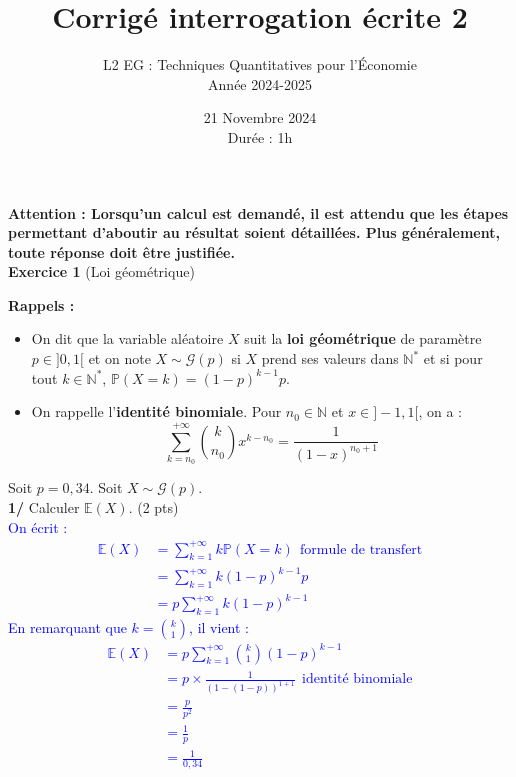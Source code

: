 \documentclass[a4paper,12pt]{article}
\title{Corrigé interrogation écrite 2}
\author{L2 EG : Techniques Quantitatives pour l'Économie \\ Année 2024-2025}
\date{21 Novembre 2024 \\
Durée : 1h}
\newcommand{\E}{\mathbb{E}}
\newcommand{\prob}{\mathbb{P}}
\begin{document}
\maketitle

\textbf{Attention : Lorsqu'un calcul est demandé, il est attendu que les étapes permettant d'aboutir au résultat soient détaillées. Plus généralement, toute réponse doit être justifiée.} \\

\textbf{Exercice 1} (Loi géométrique) \\

\begin{tcolorbox}[colframe=black, colback=white, sharp corners, width=\textwidth, boxrule=0.5mm]
\textbf{Rappels :}\\
\begin{itemize}
    \item On dit que la variable aléatoire $X$ suit la \textbf{loi géométrique} de paramètre $p \in ]0,1[$ et on note $X \sim \mathcal{G} (p)$ si $X$ prend ses valeurs dans $\mathbb{N}^*$ et si pour tout $k \in \mathbb{N}^*$, $\prob (X=k) = (1-p)^{k-1} p$. \\

\item On rappelle l'\textbf{identité binomiale}. Pour $n_0 \in \mathbb{N}$ et $x \in ]-1,1[$, on a :
$$\sum_{k=n_0}^{+\infty} \binom{k}{n_0} x^{k-n_0} = \frac{1}{(1-x)^{n_0+1}}$$

\end{itemize}
\end{tcolorbox}


Soit $p=0,34$. Soit $X \sim \mathcal{G} (p)$. \\

\textbf{1/} Calculer $\E (X)$. (2 pts) \\

\textcolor{blue}{
On écrit :
\begin{align*}
\E (X) &= \sum_{k=1}^{+ \infty} k \prob (X=k) \ \ \text{formule de transfert} \\
& = \sum_{k=1}^{+\infty} k (1-p)^{k-1} p \\
& = p \sum_{k=1}^{+ \infty} k (1-p)^{k-1}  
\end{align*}
En remarquant que $k = \binom{k}{1}$, il vient :
\begin{align*}
\E (X) &= p \sum_{k=1}^{+\infty} \binom{k}{1} (1-p)^{k-1} \\
& = p \times \frac{1}{(1-(1-p))^{1+1}} \ \ \text{identité binomiale} \\
& = \frac{p}{p^2} \\
& = \frac{1}{p} \\
& \boxed{= \frac{1}{0,34} }
\end{align*}
}
\end{document}
